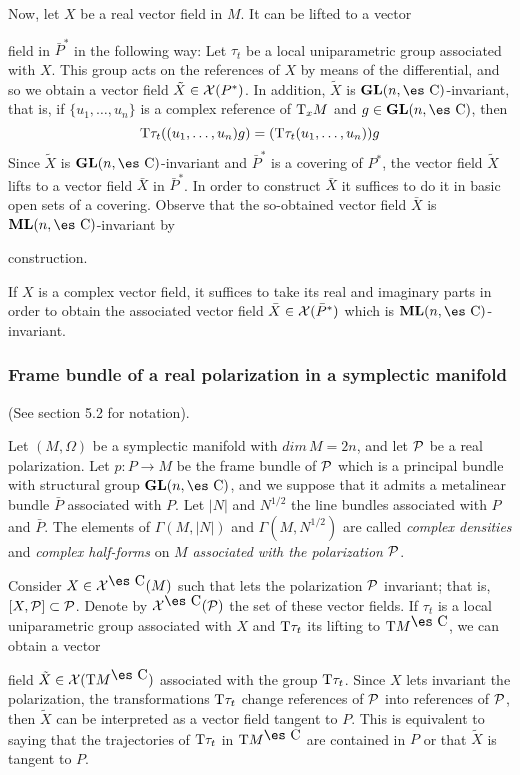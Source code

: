 \documentclass[12pt]{article}
\theoremstyle{plain}
\def\GL{{\bf GL}(n,\Complex )}
\def\ML{{\bf ML}(n,\Complex )}
\def\Complex{\mbox{\es C}}
\def\Tan{{\rm T}}
\begin{document}
Now, let $X$ be a real vector field in $M$. It can be lifted to a vector

field in $\bar P^*$
in the following way:
Let $\tau_t$ be a local uniparametric group associated with $X$.
This group acts on the references of $X$ by means of the differential,
and so we obtain a vector field $\tilde X \in {\cal X}(P^*)$.
In addition, $\tilde X$ is $\GL$-invariant, that is, if
$\{ u_1,\ldots ,u_n \}$ is a complex reference of $\Tan_x M$ and $g \in
\GL$, then
$$
\Tan \tau_t ((u_1,\ldots ,u_n)g) = (\Tan \tau_t (u_1,\ldots ,u_n))g
$$
Since $\tilde X$ is $\GL$-invariant and $\bar P^*$ is a covering of
$P^*$,
the vector field $\tilde X$ lifts to a vector field $\bar X$ in $\bar
P^*$.
In order to construct $\bar X$ it suffices to do it in basic open sets
of a covering.
Observe that the so-obtained vector field $\bar X$ is $\ML$-invariant by

construction.

If $X$ is a complex vector field, it suffices to take its real and
imaginary parts
 in order to obtain the associated vector field
 $\bar X \in {\cal X}(\bar P^*)$
which is $\ML$-invariant.



\subsubsection{Frame bundle of a real polarization in a symplectic
manifold}

(See section 5.2 for notation).

Let $(M,\Omega )$ be a symplectic manifold with $dim\, M = 2n$,
and let ${\cal P}$ be a real polarization.
Let $p:P \to M$ be the frame bundle of ${\cal P}$
which is a principal bundle with structural group
$\GL$, and we suppose that it admits a
metalinear bundle $\bar P$ associated with $P$.
 Let $| N |$ and $N^{1/2}$ the line bundles associated with
 $P$ and $\bar P$.
The elements of $\Gamma (M,| N | )$ and $\Gamma (M,N^{1/2})$
are called {\it complex densities} and {\it complex half-forms}
on $M$ {\it associated with the polarization ${\cal P}$}.

Consider $X \in {\cal X}^{\Complex}(M)$ such that lets the polarization
${\cal P}$ invariant;
that is, $[X,{\cal P}] \subset {\cal P}$.
Denote by ${\cal X}^{\Complex}({\cal P})$ the set of these vector
fields.
If $\tau_t$ is a local uniparametric group associated with $X$ and
$\Tan \tau_t$ its lifting to $\Tan M^{\Complex}$, we can obtain a vector

field
$\tilde X \in {\cal X}(\Tan M^{\Complex})$ associated with the group
$\Tan \tau_t$.
Since $X$ lets invariant the polarization, the transformations $\Tan
\tau_t$
change references of ${\cal P}$ into references of ${\cal P}$,
then $\tilde X$ can be interpreted as a vector field tangent to $P$.
This is equivalent to saying that the trajectories of $\Tan \tau_t$ in
$\Tan M^{\Complex}$
are contained in $P$ or that $\tilde X$ is tangent to $P$.
\end{document}
